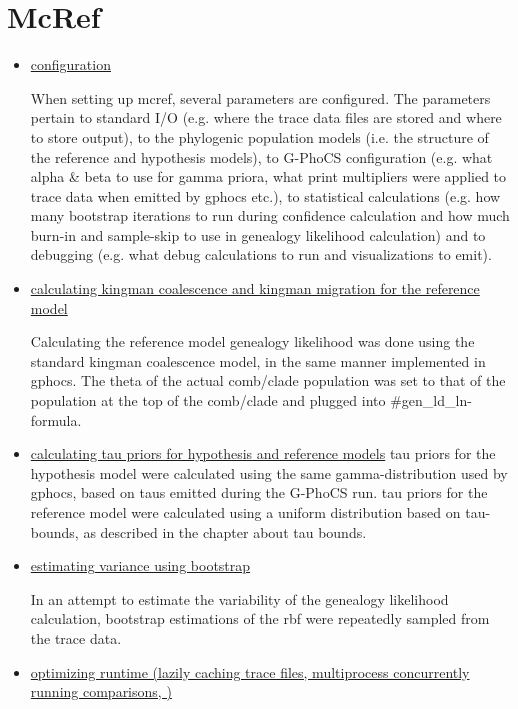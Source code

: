 \documentclass[11pt]{article}
\newcommand{\1}{\mathbbm{1}}
\newcommand{\gp}{G-PhoCS }
\begin{document}
\section{McRef}

\begin{itemize}
\item \underline{configuration}

When setting up mcref, several parameters are configured. The parameters pertain to standard I/O (e.g. where the trace data files are stored and where to store output), to the phylogenic population models (i.e. the structure of the reference and hypothesis models), to \gp configuration (e.g. what alpha \& beta to use for gamma priora, what print multipliers were applied to trace data when emitted by gphocs etc.), to statistical calculations (e.g. how many bootstrap iterations to run during confidence calculation and how much burn-in and sample-skip to use in genealogy likelihood calculation) and to debugging (e.g. what debug calculations to run and visualizations to emit). 

\item \underline{calculating kingman coalescence and kingman migration for the reference model}

Calculating the reference model genealogy likelihood was done using the standard kingman coalescence model, in the same manner implemented in gphocs. The theta of the actual comb/clade population was set to that of the population at the top of the comb/clade and plugged into \#gen\_ld\_ln-formula. 

\item \underline{calculating tau priors for hypothesis and reference models}
tau priors for the hypothesis model were calculated using the same gamma-distribution used by gphocs, based on taus emitted during the \gp run. tau priors for the reference model were calculated using a uniform distribution based on tau-bounds, as described in the chapter about tau bounds.

\item \underline{estimating variance using bootstrap}

In an attempt to estimate the variability of the genealogy likelihood calculation, bootstrap estimations of the rbf were repeatedly sampled from the trace data. 


\item \underline{optimizing runtime (lazily caching trace files, multiprocess concurrently running comparisons, )}


\end{itemize}
\end{document}
